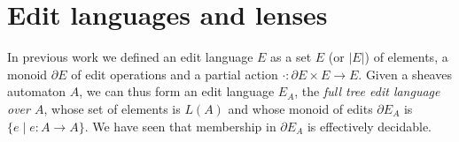 




\section{Edit languages and lenses}
In previous work \cite{HofmannPierceWagner12} we defined an edit language
$E$ as a
set $E$ (or $|E|$) of elements, a monoid $\partial E$ of edit
operations and a partial action $\cdot : \partial E\times E\rightarrow
E$. Given a sheaves automaton $A$, we can thus form an edit language
$E_A$, the \emph{full tree edit language over $A$},
 whose set of elements is $L(A)$ and whose monoid of edits
$\partial E_A$ is $\{e\mid e:A\rightarrow A\}$. We have seen that
membership in $\partial E_A$ is effectively decidable.

